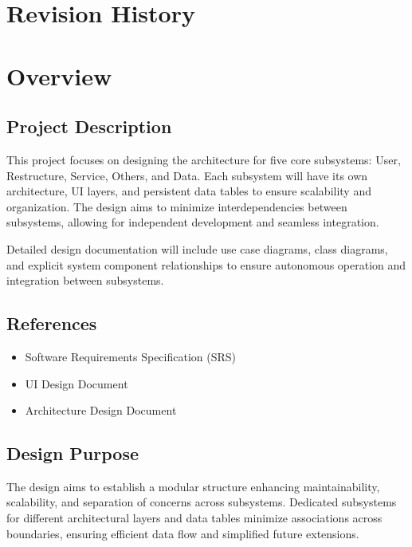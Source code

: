 
\newcommand{\myversion}{1.0}   %





\tableofcontents

\chapter*{Revision History}



\chapter{Overview}
\section{Project Description}

This project focuses on designing the architecture for five core subsystems: User, Restructure, Service, Others, and Data. Each subsystem will have its own architecture, UI layers, and persistent data tables to ensure scalability and organization. The design aims to minimize interdependencies between subsystems, allowing for independent development and seamless integration.

Detailed design documentation will include use case diagrams, class diagrams, and explicit system component relationships to ensure autonomous operation and integration between subsystems.

\section{References}

\begin{itemize}
  \item Software Requirements Specification (SRS)
  \item UI Design Document
  \item Architecture Design Document
\end{itemize}

\section{Design Purpose}

The design aims to establish a modular structure enhancing maintainability, scalability, and separation of concerns across subsystems. Dedicated subsystems for different architectural layers and data tables minimize associations across boundaries, ensuring efficient data flow and simplified future extensions.


